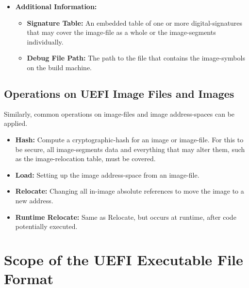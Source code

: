 \begin{itemize}
  \begin{itemize}
    \item \textbf{Type:} Indicates the type of \gls{image-relocation-fixup} to apply. This specifies the format of the data read or written at the \gls{image-relocation-fixup} offset.
    \item \textbf{Image Offset:} The offset within the \gls{image} \gls{address-space} the \gls{image-relocation-fixup} targets.
  \end{itemize}
  \item \textbf{Additional Information:}
  \begin{itemize}
    \item \textbf{Signature Table:} An embedded table of one or more \glspl{digital-signature} that may cover the \gls{image-file} as a whole or the \glspl{image-segment} individually.
    \item \textbf{Debug File Path:} The path to the file that contains the \glspl{image-symbol} on the build machine.
  \end{itemize}
\end{itemize}

\subsection{Operations on UEFI Image Files and Images}

Similarly, common operations on \glspl{image-file} and \gls{image} \glspl{address-space} can be applied.

\begin{itemize}
  \item \textbf{Hash:} Compute a \gls{cryptographic-hash} for an \gls{image} or \gls{image-file}. For this to be secure, all \glspl{image-segment} data and everything that may alter them, such as the \gls{image-relocation} table, must be covered.
  \item \textbf{Load:} Setting up the \gls{image} \gls{address-space} from an \gls{image-file}.
  \item \textbf{Relocate:} Changing all in-\gls{image} absolute references to move the \gls{image} to a new address.
  \item \textbf{Runtime Relocate:} Same as Relocate, but occurs at runtime, after code potentially executed.
\end{itemize}

\section{Scope of the UEFI Executable File Format}

